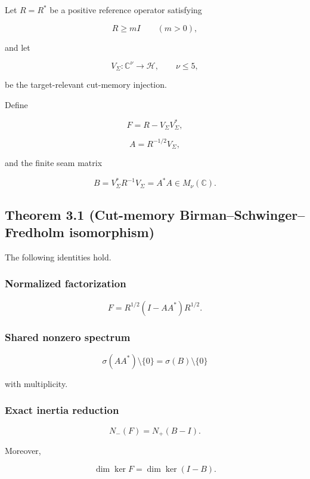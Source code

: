 Let \(R=R^*\) be a positive reference operator satisfying

\[
R\ge mI
\qquad(m>0),
\]

and let

\[
V_\Sigma:\mathbb C^\nu\longrightarrow\mathcal H,
\qquad
\nu\le5,
\]

be the target-relevant cut-memory injection.

Define

\[
F=R-V_\Sigma V_\Sigma^*,
\]

\[
A=R^{-1/2}V_\Sigma,
\]

and the finite seam matrix

\[
\boxed{
B=V_\Sigma^*R^{-1}V_\Sigma=A^*A
\in M_\nu(\mathbb C).
}
\]

\hypertarget{theorem-3.1-cut-memory-birmanschwingerfredholm-isomorphism}{%
\subsection{Theorem 3.1 (Cut-memory Birman--Schwinger--Fredholm isomorphism)}\label{theorem-3.1-cut-memory-birmanschwingerfredholm-isomorphism}}

The following identities hold.

\hypertarget{normalized-factorization}{%
\subsubsection{Normalized factorization}\label{normalized-factorization}}

\[
\boxed{
F
=
R^{1/2}(I-AA^*)R^{1/2}.
}
\]

\hypertarget{shared-nonzero-spectrum}{%
\subsubsection{Shared nonzero spectrum}\label{shared-nonzero-spectrum}}

\[
\boxed{
\sigma(AA^*)\setminus\{0\}
=
\sigma(B)\setminus\{0\}
}
\]

with multiplicity.

\hypertarget{exact-inertia-reduction}{%
\subsubsection{Exact inertia reduction}\label{exact-inertia-reduction}}

\[
\boxed{
N_-(F)=N_+(B-I).
}
\]

Moreover,

\[
\boxed{
\dim\ker F=\dim\ker(I-B).
}
\]

